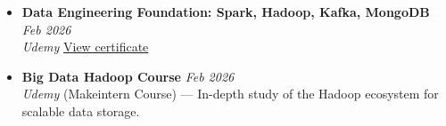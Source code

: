 \begin{itemize}[leftmargin=*, itemsep=0.35em]






\item
    \noindent\textbf{Data Engineering Foundation: Spark, Hadoop, Kafka, MongoDB} \hfill \textit{Feb 2026} \\[-0.1em]
    {\footnotesize \emph{Udemy} }%
    \hfill\href{https://www.udemy.com/certificate/UC-6ef8ca23-37ce-47bd-8db4-ae05b861e113/}{View certificate}

\item
    \noindent\textbf{Big Data Hadoop Course} \hfill \textit{Feb 2026} \\[-0.1em]
    {\footnotesize \emph{Udemy} (Makeintern Course) --- In-depth study of the Hadoop ecosystem for scalable data storage.}%

    
\end{itemize}

